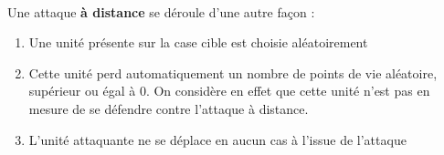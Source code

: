 \paragraph{}
Une attaque \textbf{à distance} se déroule d'une autre façon :

\begin{enumerate}
  \item Une unité présente sur la case cible est choisie aléatoirement
  \item Cette unité perd automatiquement un nombre de points de vie aléatoire, supérieur ou égal à 0. On considère en effet que cette unité n'est pas en mesure de se défendre contre l'attaque à distance.
  \item L'unité attaquante ne se déplace en aucun cas à l'issue de l'attaque
\end{enumerate}
